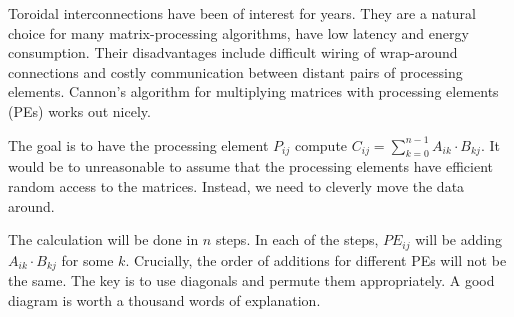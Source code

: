 \documentclass[12pt,a4paper,twoside,openright]{report}
\begin{document}
Toroidal interconnections have been of interest for years. They are a natural choice for many matrix-processing algorithms, have low latency and energy consumption. Their disadvantages include difficult wiring of wrap-around connections and costly communication between distant pairs of processing elements. Cannon's algorithm\cite{cannon} for multiplying matrices with processing elements (PEs) works out nicely.

The goal is to have the processing element $P_{ij}$ compute $C_{ij}=\sum_{k=0}^{n-1} A_{ik}\cdot B_{kj}$. It would be to unreasonable to assume that the processing elements have efficient random access to the matrices. Instead, we need to cleverly move the data around.

The calculation will be done in $n$ steps. In each of the steps, $PE_{ij}$ will be adding $A_{ik}\cdot B_{kj}$ for some $k$. Crucially, the order of additions for different PEs will not be the same. The key is to use diagonals and permute them appropriately. A good diagram is worth a thousand words of explanation. 
\end{document}
